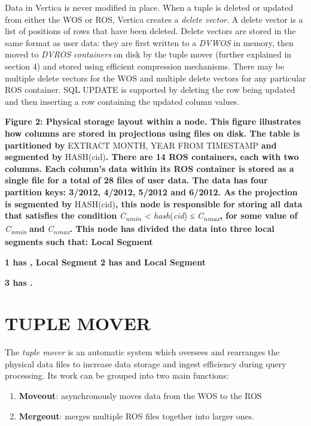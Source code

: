\documentclass[a4paper,12pt,notitlepage,twoside,openright]{article}
\begin{document}
Data in Vertica is never modified in place. When a tuple is deleted or
updated from either the WOS or ROS, Vertica creates a \emph{delete
vector}. A delete vector is a list of positions of rows that have been
deleted. Delete vectors are stored in the same format as user data: they
are first written to a \emph{DVWOS} in memory, then moved to \emph{DVROS
containers} on disk by the tuple mover (further explained in section 4)
and stored using efficient compression mechanisms. There may be multiple
delete vectors for the WOS and multiple delete vectors for any
particular ROS container. SQL UPDATE is supported by deleting the row
being updated and then inserting a row containing the updated column
values.

\textbf{Figure 2: Physical storage layout within a node. This figure
illustrates how columns are stored in projections using files on disk.
The table is partitioned by} EXTRACT MONTH, YEAR FROM TIMESTAMP
\textbf{and segmented by} HASH(cid)\textbf{. There are 14 ROS
containers, each with two columns. Each column's data within its ROS
container is stored as a single file for a total of 28 files of user
data. The data has four partition keys: 3/2012, 4/2012, 5/2012 and
6/2012. As the projection is segmented by} HASH(cid)\textbf{, this node
is responsible for storing all data that satisfies the condition}
\emph{C\textsubscript{nmin} \textless{} hash}(\emph{cid}) ≤
\emph{C\textsubscript{nmax}}\textbf{, for some value of}
\emph{C\textsubscript{nmin }}\textbf{and}
\emph{C\textsubscript{nmax}}\textbf{. This node has divided the data
into three local segments such that: Local Segment}

\textbf{1 has , Local Segment 2 has and Local Segment}

\textbf{3 has .}

\hypertarget{tuple-mover}{%
\section{TUPLE MOVER}\label{tuple-mover}}

The \emph{tuple mover} is an automatic system which oversees and
rearranges the physical data files to increase data storage and ingest
efficiency during query processing. Its work can be grouped into two
main functions:

\begin{enumerate}
\def\labelenumi{\arabic{enumi}.}
\item
  \textbf{Moveout}: asynchronously moves data from the WOS to the ROS
\item
  \textbf{Mergeout}: merges multiple ROS files together into larger
  ones.
\end{enumerate}
\end{document}
